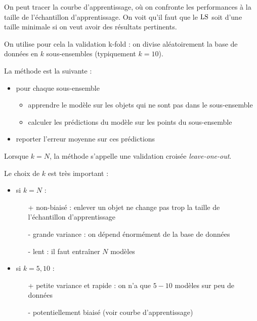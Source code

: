 	On peut tracer la courbe d'apprentissage, où on confronte les performances à la taille de l'échantillon d'apprentissage. On voit qu'il faut que le $\text{LS}$ soit d'une taille minimale si on veut avoir des résultats pertinents.
	
	
	On utilise pour cela la validation k-fold : on divise aléatoirement la base de données en $k$ sous-ensembles (typiquement $k = 10$).
	
	
	La méthode est la suivante :
	
	\begin{itemize}
		\item pour chaque sous-ensemble
		\begin{itemize}
			\item apprendre le modèle sur les objets qui ne sont pas dans le sous-ensemble
			\item calculer les prédictions du modèle sur les points du sous-ensemble
		\end{itemize}
		\item reporter l'erreur moyenne sur ces prédictions
	\end{itemize}
	
	Lorsque $k = N$, la méthode s'appelle une validation croisée \textit{leave-one-out}.
	
	Le choix de $k$ est très important :
	
	\begin{itemize}
		\item si $k = N$ :
		\begin{itemize}
			\item[+] non-biaisé : enlever un objet ne change pas trop la taille de l'échantillon d'apprentissage
			\item[-] grande variance : on dépend énormément de la base de données
			\item[-] lent : il faut entraîner $N$ modèles
		\end{itemize}
		\item si $k = 5, 10$ :
		
		\begin{itemize}
			\item[+] petite variance et rapide : on n'a que $5-10$ modèles sur peu de données
			\item[-] potentiellement biaisé (voir courbe d'apprentissage)
		\end{itemize}
	\end{itemize}
	
